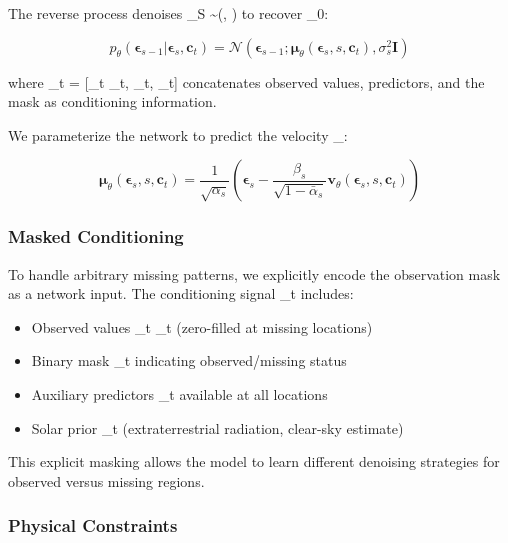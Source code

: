 \documentclass[preprint,12pt]{elsarticle}
\begin{document}
The reverse process denoises \boldsymbol{\epsilon}_S \sim {}(, ) to recover \boldsymbol{\epsilon}_0:

\begin{equation}
p_\theta(\boldsymbol{\epsilon}_{s-1} | \boldsymbol{\epsilon}_s, \mathbf{c}_t) = \mathcal{N}(\boldsymbol{\epsilon}_{s-1}; \boldsymbol{\mu}_\theta(\boldsymbol{\epsilon}_s, s, \mathbf{c}_t), \sigma_s^2\mathbf{I})
\label{eq:reverse}
\end{equation}

where _t = [_t \odot {}_t, _t, _t] concatenates observed values, predictors, and the mask as conditioning information.

We parameterize the network to predict the velocity _\theta \cite{salimans2022progressive}:

\begin{equation}
\boldsymbol{\mu}_\theta(\boldsymbol{\epsilon}_s, s, \mathbf{c}_t) = \frac{1}{\sqrt{\alpha_s}}\left(\boldsymbol{\epsilon}_s - \frac{\beta_s}{\sqrt{1-\bar{\alpha}_s}}\mathbf{v}_\theta(\boldsymbol{\epsilon}_s, s, \mathbf{c}_t)\right)
\label{eq:velocity}
\end{equation}

\subsubsection{Masked Conditioning}

To handle arbitrary missing patterns, we explicitly encode the observation mask as a network input. The conditioning signal _t includes:

\begin{itemize}
\item Observed values _t \odot {}_t (zero-filled at missing locations)
\item Binary mask _t indicating observed/missing status
\item Auxiliary predictors _t available at all locations
\item Solar prior _t (extraterrestrial radiation, clear-sky estimate)
\end{itemize}

This explicit masking allows the model to learn different denoising strategies for observed versus missing regions.

\subsubsection{Physical Constraints}
\end{document}
